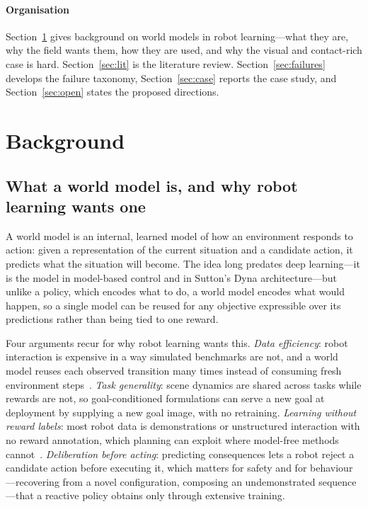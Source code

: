 \documentclass[11pt,letterpaper]{article}
\begin{document}
\paragraph{Organisation}
Section~\ref{sec:background} gives background on world models in robot
learning---what they are, why the field wants them, how they are used, and why
the visual and contact-rich case is hard. Section~\ref{sec:lit} is the
literature review. Section~\ref{sec:failures} develops the failure taxonomy,
Section~\ref{sec:case} reports the case study, and Section~\ref{sec:open} states
the proposed directions.

\section{Background}\label{sec:background}

\subsection{What a world model is, and why robot learning wants one}

A world model is an internal, learned model of how an environment responds to
action: given a representation of the current situation and a candidate
action, it predicts what the situation will become. The idea long predates
deep learning---it is the model in model-based control and in Sutton's Dyna
architecture---but unlike a policy, which encodes what to do, a world model
encodes what would happen, so a single model can be reused for any objective
expressible over its predictions rather than being tied to one reward.

Four arguments recur for why robot learning wants this. \emph{Data
efficiency}: robot interaction is expensive in a way simulated benchmarks are
not, and a world model reuses each observed transition many times instead of
consuming fresh environment steps~\citep{ha2018worldmodels,hafner2019planet}.
\emph{Task generality}: scene dynamics are shared across tasks while rewards
are not, so goal-conditioned formulations can serve a new goal at deployment
by supplying a new goal image, with no retraining. \emph{Learning without
reward labels}: most robot data is demonstrations or unstructured
interaction with no reward annotation, which planning can exploit where
model-free methods cannot~\citep{sobal2025pldm}. \emph{Deliberation before
acting}: predicting consequences lets a robot reject a candidate action
before executing it, which matters for safety and for behaviour---recovering
from a novel configuration, composing an undemonstrated sequence---that a
reactive policy obtains only through extensive training.
\end{document}
